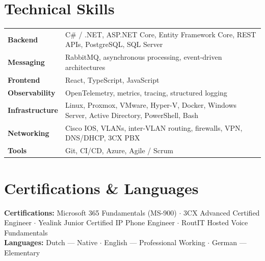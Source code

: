 \documentclass[a4paper,10pt]{article}
\begin{document}
\section{Technical Skills}

\begin{tabularx}{\textwidth}{@{}>{\bfseries\small}l@{\hspace{8pt}}X@{}}
Backend         & C\# / .NET, ASP.NET Core, Entity Framework Core, REST APIs, PostgreSQL, SQL Server \\[0pt]
Messaging       & RabbitMQ, asynchronous processing, event-driven architectures \\[0pt]
Frontend        & React, TypeScript, JavaScript \\[0pt]
Observability   & OpenTelemetry, metrics, tracing, structured logging \\[0pt]
Infrastructure  & Linux, Proxmox, VMware, Hyper-V, Docker, Windows Server, Active Directory, PowerShell, Bash \\[0pt]
Networking      & Cisco IOS, VLANs, inter-VLAN routing, firewalls, VPN, DNS/DHCP, 3CX PBX \\[0pt]
Tools           & Git, CI/CD, Azure, Agile / Scrum \\
\end{tabularx}

\section{Certifications \& Languages}

\textbf{Certifications:} Microsoft 365 Fundamentals (MS-900) $\cdot$ 3CX Advanced Certified Engineer $\cdot$ Yealink Junior Certified IP Phone Engineer $\cdot$ RoutIT Hosted Voice Fundamentals\\
\textbf{Languages:} Dutch --- Native $\cdot$ English --- Professional Working $\cdot$ German --- Elementary
\end{document}
